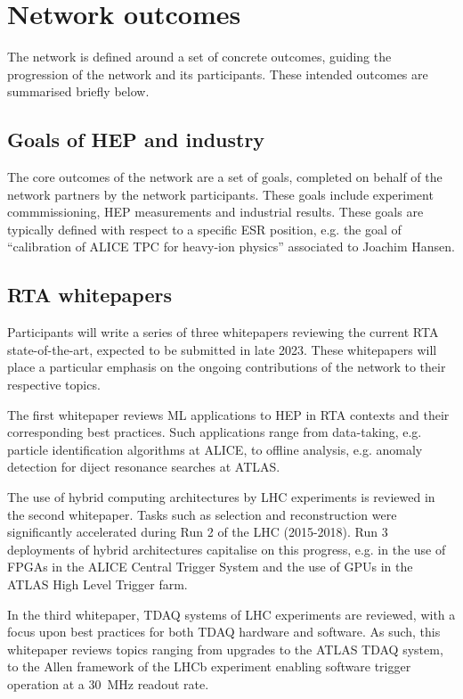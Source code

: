 \section{Network outcomes}
\label{outcomes}
The network is defined around a set of concrete outcomes, guiding the progression of the network and its participants. These intended outcomes are summarised briefly below.

\subsection{Goals of HEP and industry}
\label{goals}
The core outcomes of the network are a set of goals, completed on behalf of the network partners by the network participants.  These goals include experiment commmissioning, HEP measurements and industrial results. These goals are typically defined with respect to a specific ESR position, e.g. the goal of ``calibration of ALICE TPC for heavy-ion physics'' associated to Joachim Hansen.

\subsection{RTA whitepapers}
\label{whitepapers}
Participants will write a series of three whitepapers reviewing the current RTA state-of-the-art, expected to be submitted in late 2023. These whitepapers will place a particular emphasis on the ongoing contributions of the network to their respective topics. \par 

The first whitepaper reviews ML applications to HEP in RTA contexts and their corresponding best practices. Such applications range from data-taking, e.g. particle identification algorithms at ALICE, to offline analysis, e.g. anomaly detection for diject resonance searches at ATLAS. \cite{ALICE-PID, ATLAS-dijet}\par
The use of hybrid computing architectures by LHC experiments is reviewed in the second whitepaper. Tasks such as selection and reconstruction were significantly accelerated during Run 2 of the LHC (2015-2018). Run 3 deployments of hybrid architectures capitalise on this progress, e.g. in the use of FPGAs in the ALICE Central Trigger System and the use of GPUs in the ATLAS High Level Trigger farm. \cite{ALICE-CTS, CMS-HLT-farm}\par
In the third whitepaper, TDAQ systems of LHC experiments are reviewed, with a focus upon best practices for both TDAQ hardware and software. As such, this whitepaper reviews topics ranging from upgrades to the ATLAS TDAQ system, to the Allen framework of the LHCb experiment enabling software trigger operation at a 30~MHz readout rate. \cite{ATLAS-TDAQ, LHCb-Allen}

